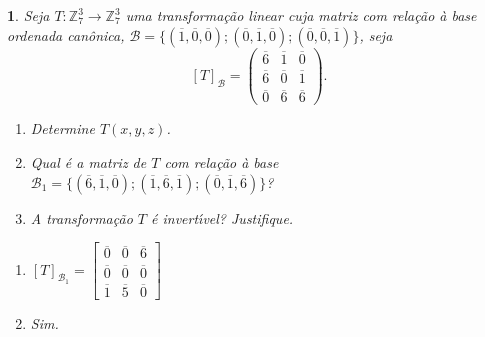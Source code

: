 \documentclass[12pt]{exam}
\newtheorem{exercicio}{}
\newcommand{\integer}{\mathbb{Z}}
\begin{document}
\begin{exercicio}
  Seja $T : \integer_7^3 \to \integer_7^3$ uma transforma\c{c}\~ao linear cuja matriz com rela\c{c}\~ao \`a base ordenada can\^onica, $\mathcal{B} = \{(\overline{1}, \overline{0}, \overline{0}); (\overline{0}, \overline{1}, \overline{0}); (\overline{0}, \overline{0}, \overline{1})\}$, seja
  \[
    [T]_\mathcal{B} = \begin{pmatrix}
      \overline{6} & \overline{1} & \overline{0}\\
      \overline{6} & \overline{0} & \overline{1}\\
      \overline{0} & \overline{6} & \overline{6}
    \end{pmatrix}.
  \]
    \begin{enumerate}[label=({\alph*})]
      \item Determine $T(x,y,z)$.
      \item Qual \'e a matriz de $T$ com rela\c{c}\~ao \`a base $\mathcal{B}_1 = \{(\overline{6},\overline{1},\overline{0});(\overline{1},\overline{6},\overline{1});(\overline{0},\overline{1},\overline{6})\}$?
      \item A transforma\c{c}\~ao $T$ \'e invert{\'\i}vel? Justifique.
    \end{enumerate}
    \begin{solucao}
      \begin{enumerate}
        \item[b)] $[T]_{\mathcal{B}_1} = \begin{bmatrix}
          \overline{0} & \overline{0} & \overline{6}\\
          \overline{0} & \overline{0} & \overline{0}\\
          \overline{1} & \overline{5} & \overline{0}
        \end{bmatrix}$
        \item[c)] Sim.
      \end{enumerate}
    \end{solucao}
\end{exercicio}
\end{document}
